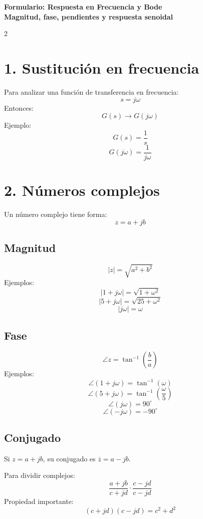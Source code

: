 \documentclass[11pt]{article}
\begin{document}
\begin{center}
{\Large \textbf{Formulario: Respuesta en Frecuencia y Bode}}\\
\vspace{0.2cm}
\textbf{Magnitud, fase, pendientes y respuesta senoidal}
\end{center}

\begin{multicols}{2}

\section*{1. Sustitución en frecuencia}

Para analizar una función de transferencia en frecuencia:
\[
s = j\omega
\]
Entonces:
\[
G(s) \rightarrow G(j\omega)
\]
Ejemplo:
\[
G(s)=\frac{1}{s}
\]
\[
G(j\omega)=\frac{1}{j\omega}
\]

\section*{2. Números complejos}

Un número complejo tiene forma:
\[
z=a+jb
\]

\subsection*{Magnitud}
\[
|z|=\sqrt{a^2+b^2}
\]
Ejemplos:
\[
|1+j\omega|=\sqrt{1+\omega^2}
\]
\[
|5+j\omega|=\sqrt{25+\omega^2}
\]
\[
|j\omega|=\omega
\]

\subsection*{Fase}
\[
\angle z=\tan^{-1}\!\left(\frac{b}{a}\right)
\]
Ejemplos:
\[
\angle(1+j\omega)=\tan^{-1}(\omega)
\]
\[
\angle(5+j\omega)=\tan^{-1}\!\left(\frac{\omega}{5}\right)
\]
\[
\angle(j\omega)=90^\circ
\]
\[
\angle(-j\omega)=-90^\circ
\]

\subsection*{Conjugado}

Si $z=a+jb$, su conjugado es $\overline{z}=a-jb$.

Para dividir complejos:
\[
\frac{a+jb}{c+jd}\cdot\frac{c-jd}{c-jd}
\]
Propiedad importante:
\[
(c+jd)(c-jd)=c^2+d^2
\]


\end{multicols}
\end{document}
